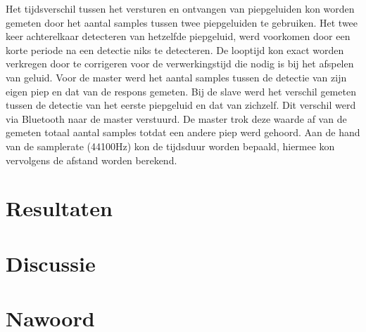 \documentclass[12pt]{article}
\begin{document}
Het tijdsverschil tussen het versturen en ontvangen van piepgeluiden kon worden gemeten door het aantal samples tussen twee piepgeluiden te gebruiken. Het twee keer achterelkaar detecteren van hetzelfde piepgeluid, werd voorkomen door een korte periode na een detectie niks te detecteren. De looptijd kon exact worden verkregen door te corrigeren voor de verwerkingstijd die nodig is bij het afspelen van geluid. Voor de master werd het aantal samples tussen de detectie van zijn eigen piep en dat van de respons gemeten. Bij de slave werd het verschil gemeten tussen de detectie van het eerste piepgeluid en dat van zichzelf. Dit verschil werd via Bluetooth naar de master verstuurd. De master trok deze waarde af van de gemeten totaal aantal samples totdat een andere piep werd gehoord. Aan de hand van de samplerate (44100Hz) kon de tijdsduur worden bepaald, hiermee kon vervolgens de afstand worden berekend.

\section{Resultaten}

\section{Discussie}

\section{Nawoord}
\end{document}
